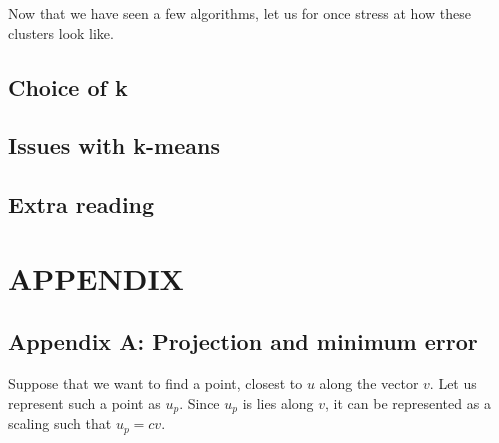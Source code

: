 \documentclass[12pt,a4paper]{article}
\begin{document}
Now that we have seen a few algorithms, let us for once stress at how these clusters look like.

\subsection{Choice of k}

\subsection{Issues with k-means}

\subsection{Extra reading}

\newpage
\section{APPENDIX}
\subsection{Appendix A: Projection and minimum error}
Suppose that we want to find a point, closest to $u$ along the vector $v$. Let us represent such a point as $u_p$. Since $u_p$ is lies along $v$, it can be represented as a scaling such that $u_p= cv$. 
\end{document}

